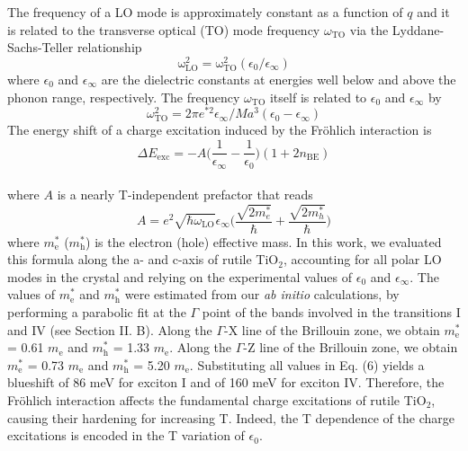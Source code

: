 \documentclass[aps,prl,twocolumn,amsfonts,nobibnotes,superscriptaddress,showpacs]{revtex4-1}
\begin{document}
The frequency of a LO mode is approximately constant as a function of $q$ and it is related to the transverse optical (TO) mode frequency $\omega\mathrm{_{TO}}$ via the Lyddane-Sachs-Teller relationship \cite{lyddane1941polar}
\begin{equation}
\mathrm{\omega_{LO}^2} = {\mathrm{\omega^2_{TO}}}(\epsilon_{0}/\epsilon_{\infty})
\end{equation}
where $\epsilon_{0}$ and $\epsilon_{\infty}$ are the dielectric constants at energies well below and above the phonon range, respectively. The frequency $\omega\mathrm{_{TO}}$ itself is related to $\epsilon_{0}$ and $\epsilon_{\infty}$ by
\begin{equation}
\omega\mathrm{^2_{TO}} = 2\pi e^{*2} \epsilon_{\infty}/Ma^3 (\epsilon_{0} - \epsilon_{\infty})
\end{equation}
The energy shift of a charge excitation induced by the Fr\"ohlich interaction is
\begin{equation}
\Delta E\mathrm{_{exc}} = -A \Bigg(\frac{1}{\epsilon_{\infty}} - \frac{1}{\epsilon_{0}}\Bigg)(1 + 2n\mathrm{_{BE}})
\end{equation}\\
\noindent where $A$ is a nearly T-independent prefactor that reads
\begin{equation}
A = e^2 \sqrt{\hbar \omega\mathrm{_{LO}}} \epsilon_{\infty} \Bigg(\frac{\sqrt{2m_e^*}}{\hbar} + \frac{\sqrt{2m_h^*}}{\hbar}\Bigg)
\end{equation}
where $m\mathrm{_e^*}$ ($m\mathrm{_h^*}$) is the electron (hole) effective mass. In this work, we evaluated this formula along the a- and c-axis of rutile TiO$_2$, accounting for all polar LO modes in the crystal and relying on the experimental values of $\epsilon_{0}$ and $\epsilon_{\infty}$. The values of $m\mathrm{_e^*}$ and $m\mathrm{_h^*}$ were estimated from our \textit{ab initio} calculations, by performing a parabolic fit at the $\Gamma$ point of the bands involved in the transitions I and IV (see Section II. B). Along the $\Gamma$-X line of the Brillouin zone, we obtain $m\mathrm{_e^*}$ = 0.61 $m\mathrm{_e}$ and $m\mathrm{_h^*}$ = 1.33 $m\mathrm{_e}$. Along the $\Gamma$-Z line of the Brillouin zone, we obtain $m\mathrm{_e^*}$ = 0.73 $m\mathrm{_e}$ and $m\mathrm{_h^*}$ = 5.20 $m\mathrm{_e}$. Substituting all values in Eq. (6) yields a blueshift of 86 meV for exciton I and of 160 meV for exciton IV. Therefore, the Fr\"ohlich interaction affects the fundamental charge excitations of rutile TiO$_2$, causing their hardening for increasing T. Indeed, the T dependence of the charge excitations is encoded in the T variation of $\epsilon_{0}$.
\end{document}
